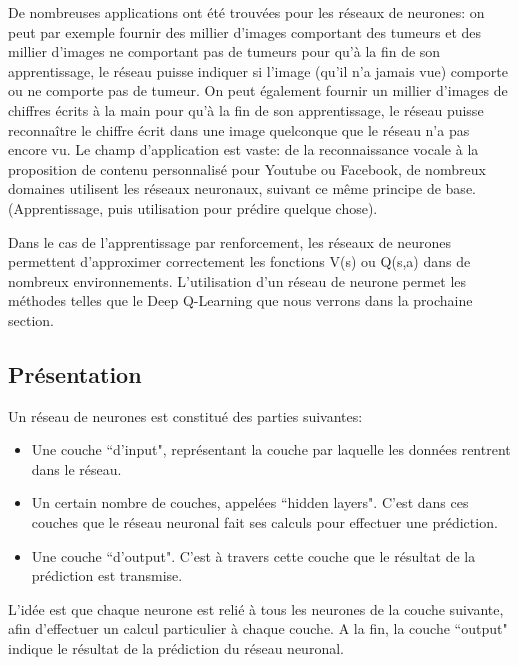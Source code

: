 \documentclass[11pt,a4paper]{report}
\begin{document}
      \par De nombreuses applications ont été trouvées pour les réseaux de neurones: on peut par exemple fournir des millier d'images comportant des tumeurs et des millier d'images ne comportant pas de tumeurs pour qu'à la fin de son apprentissage, le réseau puisse indiquer si l'image (qu'il n'a jamais vue) comporte ou ne comporte pas de tumeur. On peut également fournir un millier d'images de chiffres écrits à la main pour qu'à la fin de son apprentissage, le réseau puisse reconnaître le chiffre écrit dans une image quelconque que le réseau n'a pas encore vu. Le champ d'application est vaste: de la reconnaissance vocale à la proposition de contenu personnalisé pour Youtube ou Facebook, de nombreux domaines utilisent les réseaux neuronaux, suivant ce même principe de base. (Apprentissage, puis utilisation pour prédire quelque chose). 
      
      \par Dans le cas de l'apprentissage par renforcement, les réseaux de neurones permettent d'approximer correctement les fonctions V(s) ou Q(s,a) dans de nombreux environnements. L'utilisation d'un réseau de neurone permet les méthodes telles que le Deep Q-Learning que nous verrons dans la prochaine section. 
      
  \subsection{Présentation}
  
    \par Un réseau de neurones est constitué des parties suivantes: 

    \renewcommand{\labelitemi}{\textbullet}
    \begin{itemize}
    \item Une couche ``d'input", représentant la couche par laquelle les données rentrent dans le réseau. 
    \item Un certain nombre de couches, appelées ``hidden layers". C'est dans ces couches que le réseau neuronal fait ses calculs pour effectuer une prédiction. 
    \item Une couche ``d'output". C'est à travers cette couche que le résultat de la prédiction est transmise. 
    \end{itemize}    
    
    \par L'idée est que chaque neurone est relié à tous les neurones de la couche suivante, afin d'effectuer un calcul particulier à chaque couche. A la fin, la couche ``output" indique le résultat de la prédiction du réseau neuronal. 
    
\end{document}
